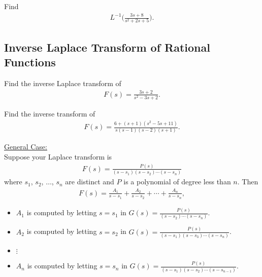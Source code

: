 \documentclass[12pt,a4paper]{article}
\newcounter{example}[section]
\begin{document}
	\newpage
	
	\begin{example}
	Find
		\begin{align*}
		L^{-1} \Big( \frac{3s + 8}{s^2 + 2s + 5} \Big) .
		\end{align*}
	\end{example}
	
	\newpage
	
	\subsection{Inverse Laplace Transform of Rational Functions}
	
	\begin{example}
	Find the inverse Laplace transform of
		\begin{align*}
		F(s) = \frac{3s + 2}{s^2 - 3s + 2} .
		\end{align*}
	\end{example}
	
	\newpage
	
	\begin{example}
	Find the inverse transform of
		\begin{align*}
		F(s) = \frac{6 + (s + 1) (s^2 - 5s + 11)}{s (s - 1) (s - 2) (s + 1)} .
		\end{align*}
	\end{example}
	
	\newpage
	\phantom{2}
	
	\newpage
	
	\underline{General Case:}\\
	Suppose your Laplace transform is
		\begin{align*}
		F(s) = \frac{P(s)}{(s - s_1) (s - s_2) \cdots (s - s_n)}
		\end{align*}
	where $s_1$, $s_2$, $\ldots$, $s_n$ are distinct and $P$ is a polynomial of degree less than $n$. Then
		\begin{align*}
		F(s) = \frac{A_1}{s - s_1} + \frac{A_2}{s - s_2} + \cdots + \frac{A_n}{s - s_n},
		\end{align*}
	\begin{itemize}
	\item $A_1$ is computed by letting $s = s_1$ in $G(s) = \displaystyle\frac{P(s)}{(s - s_2) \cdots (s - s_n )}$.
	\item $A_2$ is computed by letting $s = s_2$ in $G(s) = \displaystyle\frac{P(s)}{(s - s_1 ) (s - s_3) \cdots (s - s_n)}$.
	\item \hfill $\vdots$ \hfill \phantom{@} \hfill \phantom{2} \hfill \phantom{2}
	\item $A_n$ is computed by letting $s = s_n$ in $G(s) = \displaystyle \frac{P(s)}{(s - s_1) (s - s_2) \cdots (s - s_{n-1})}$.
	\end{itemize}
	
\end{document}
